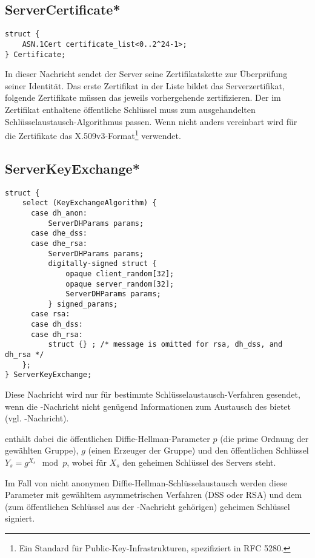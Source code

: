 \subsection{ServerCertificate*}

\begin{lstlisting}
struct {
	ASN.1Cert certificate_list<0..2^24-1>;
} Certificate;
\end{lstlisting}

In dieser Nachricht sendet der Server seine Zertifikatskette zur Überprüfung seiner Identität. Das erste Zertifikat in der Liste bildet das Serverzertifikat, folgende Zertifikate müssen das jeweils vorhergehende zertifizieren. Der im Zertifikat enthaltene öffentliche Schlüssel muss zum ausgehandelten Schlüsselaustausch-Algorithmus passen. Wenn nicht anders vereinbart wird für die Zertifikate das X.509v3-Format\footnote{Ein Standard für Public-Key-Infrastrukturen, spezifiziert in RFC 5280.} verwendet.

\subsection{ServerKeyExchange*}

\begin{lstlisting}
struct {
	select (KeyExchangeAlgorithm) {
	  case dh_anon:
	      ServerDHParams params;
	  case dhe_dss:
	  case dhe_rsa:
	      ServerDHParams params;
	      digitally-signed struct {
	          opaque client_random[32];
	          opaque server_random[32];
	          ServerDHParams params;
	      } signed_params;
	  case rsa:
	  case dh_dss:
	  case dh_rsa:
	      struct {} ; /* message is omitted for rsa, dh_dss, and dh_rsa */
	};
} ServerKeyExchange;
\end{lstlisting}

Diese Nachricht wird nur für bestimmte Schlüsselaustausch-Verfahren gesendet, wenn die \servercertificate{}-Nachricht nicht genügend Informationen zum Austausch des \premastersecret{} bietet (vgl. \clientkeyexchange{}-Nachricht).

 enthält dabei die öffentlichen Diffie-Hellman-Parameter \(p\) (die prime Ordnung der gewählten Gruppe), \(g\) (einen Erzeuger der Gruppe) und den öffentlichen Schlüssel \(Y_s = g^{X_s} \mod{p}\), wobei für \(X_s\) den geheimen Schlüssel des Servers steht.

Im Fall von nicht anonymen Diffie-Hellman-Schlüsselaustausch werden diese Parameter mit gewähltem asymmetrischen Verfahren (DSS oder RSA) und dem (zum öffentlichen Schlüssel aus der \servercertificate{}-Nachricht gehörigen) geheimen Schlüssel signiert.

